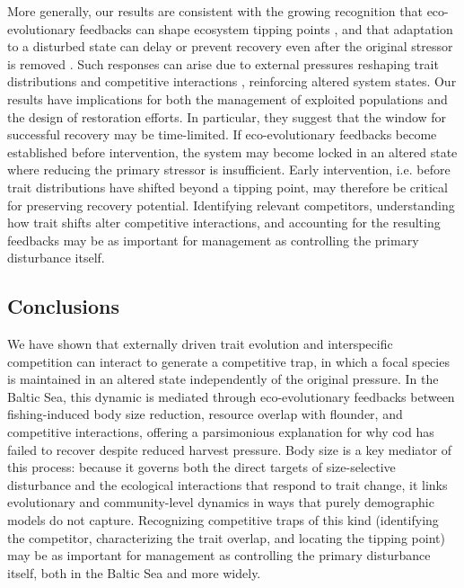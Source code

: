 \documentclass[12pt]{article}
\begin{document}
More generally, our results are consistent with the growing recognition that eco-evolutionary feedbacks can shape ecosystem tipping points \citep{dakos2019ecosystem}, and that adaptation to a disturbed state can delay or prevent recovery even after the original stressor is removed \citep{chaparro2021adaptive}. Such responses can arise due to external pressures reshaping trait distributions and competitive interactions \citep{ehrlich2025role, hart2019effects}, reinforcing altered system states. Our results have implications for both the management of exploited populations and the design of restoration efforts. In particular, they suggest that the window for successful recovery may be time-limited. If eco-evolutionary feedbacks become established before intervention, the system may become locked in an altered state where reducing the primary stressor is insufficient. Early intervention, i.e. before trait distributions have shifted beyond a tipping point, may therefore be critical for preserving recovery potential. Identifying relevant competitors, understanding how trait shifts alter competitive interactions, and accounting for the resulting feedbacks may be as important for management as controlling the primary disturbance itself.


\subsection*{Conclusions}

We have shown that externally driven trait evolution and interspecific competition can interact to generate a competitive trap, in which a focal species is maintained in an altered state independently of the original pressure. In the Baltic Sea, this dynamic is mediated through eco-evolutionary feedbacks between fishing-induced body size reduction, resource overlap with flounder, and competitive interactions, offering a parsimonious explanation for why cod has failed to recover despite reduced harvest pressure. Body size is a key mediator of this process: because it governs both the direct targets of size-selective disturbance and the ecological interactions that respond to trait change, it links evolutionary and community-level dynamics in ways that purely demographic models do not capture. Recognizing competitive traps of this kind (identifying the competitor, characterizing the trait overlap, and locating the tipping point) may be as important for management as controlling the primary disturbance itself, both in the Baltic Sea and more widely.
\end{document}
